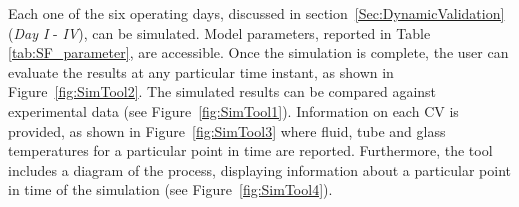 \documentclass[final,3p,times,review]{elsarticle}
\begin{document}


Each one of the six operating days, discussed in section~\ref{Sec:DynamicValidation} (\textit{Day I} - \textit{IV}), can be simulated. Model parameters, reported in Table \ref{tab:SF_parameter}, are accessible. Once the simulation is complete, the user can evaluate the results at any particular time instant, as shown in Figure~\ref{fig:SimTool2}. The simulated results can be compared against experimental data (see Figure~\ref{fig:SimTool1}). Information on each CV is provided, as shown in Figure~\ref{fig:SimTool3} where fluid, tube and glass temperatures for a particular point in time are reported. Furthermore, the tool includes a diagram of the process, displaying information about a particular point in time of the simulation (see Figure~\ref{fig:SimTool4}).

%
\end{document}
